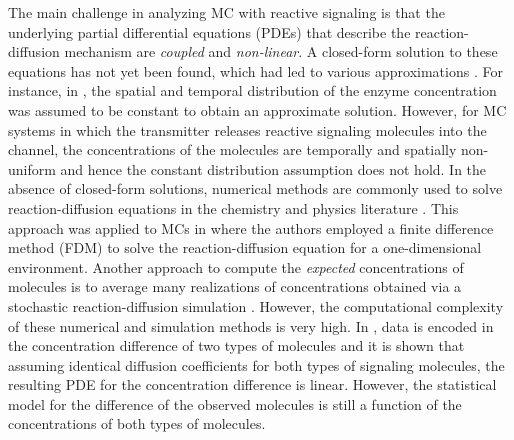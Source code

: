 \documentclass[conference]{IEEEtran}
\begin{document}
The main challenge in analyzing MC with reactive signaling is that the underlying partial differential equations (PDEs) that describe the reaction-diffusion mechanism are \textit{coupled} and \textit{non-linear}. A closed-form solution to these equations has not yet been found, which had led to various approximations  \cite{NonlinearPDE_Debnath}. For instance,  in \cite{Adam_Enzyme}, the spatial and temporal distribution of the enzyme concentration was assumed to be constant to obtain an approximate solution. However, for MC systems in which the transmitter releases reactive signaling molecules into the channel, the concentrations of the molecules are temporally and spatially non-uniform and hence the constant distribution assumption does not hold. In the absence of closed-form solutions, numerical methods are commonly used to solve reaction-diffusion equations   in the chemistry and physics literature   \cite{PDE_numerical}.  This approach was applied to MCs in \cite{Nariman_Acid} where the authors employed a finite difference method (FDM) to solve the reaction-diffusion equation for a one-dimensional environment.  Another approach to compute the \textit{expected} concentrations of molecules is to average many realizations of concentrations obtained via a stochastic reaction-diffusion simulation  \cite{ReactionDiffSim,Chou_MasterEq,Adam_AcCoRD}. However, the computational complexity of these numerical and simulation methods is very high.  In \cite{Reza_Reaction}, data is encoded in the concentration difference of two types of molecules and it is shown that assuming identical diffusion coefficients for both types of signaling molecules, the resulting PDE for the concentration difference is linear. However, the statistical model for the difference of the observed molecules is still a function of the concentrations of both types of molecules.
\end{document}
